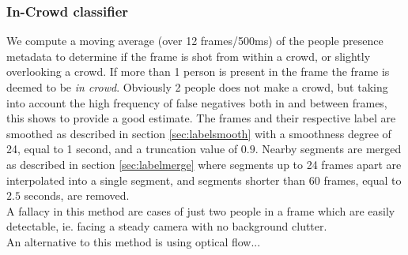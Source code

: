 \subsubsection{In-Crowd classifier}\label{sec:incrowd}
%
%
We compute a moving average (over 12 frames/500ms) of the people presence metadata to determine if the frame is shot from within a crowd, or slightly overlooking a crowd. If more than 1 person is present in the frame the frame is deemed to be \textit{in crowd}. Obviously 2 people does not make a crowd, but taking into account the high frequency of false negatives both in and between frames, this shows to provide a good estimate. The frames and their respective label are smoothed as described in section \ref{sec:labelsmooth} with a smoothness degree of 24, equal to 1 second, and a truncation value of $0.9$. Nearby segments are merged as described in section \ref{sec:labelmerge} where segments up to 24 frames apart are interpolated into a single segment, and segments shorter than 60 frames, equal to $2.5$ seconds, are removed.\\
A fallacy in this method are cases of just two people in a frame which are easily detectable, ie. facing a steady camera with no background clutter.\\
An alternative to this method is using optical flow... %
%

